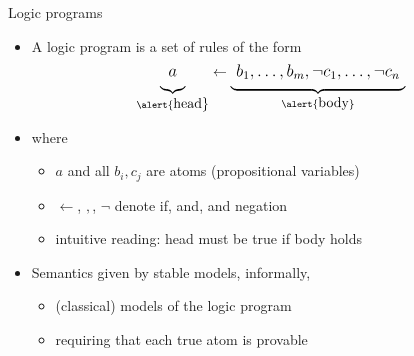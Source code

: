 \begin{frame}{Logic programs}
  \medskip
  \begin{itemize}
  \item<2->
    A \alert{logic program} is a \alert{set of rules} of the form
    \begin{align*}\large
      \underbrace{a\raisebox{-6pt}{}}_{\text{\alert{\normalsize head}}}
      \leftarrow
      \underbrace{\raisebox{-6pt}{\ }b_1,\dots,b_m,\neg c_1,\dots,\neg c_n\raisebox{-6pt}{\ }}_{\alert{\text{\normalsize body}}}
    \end{align*}
  \item<2-> [] where
    \begin{itemize}\normalsize
    \item $a$ and all $b_i,c_j$ are \alert{atoms} (propositional variables)
    \item \alert{$\leftarrow$}, \alert{$,$}, \alert{$\neg$} denote \alert{if}, \alert{and}, and \alert{negation}
    \item intuitive reading: \alert{head} must be true \alert{if body} holds
    \end{itemize}
    \bigskip
  \item<3->
    Semantics given by \alert{stable models}, informally,
    \begin{itemize}\normalsize
    \item (classical) models of the logic program
    \item \alert<4>{requiring that each true atom is provable}
    \end{itemize}
  \end{itemize}
\end{frame}
%
